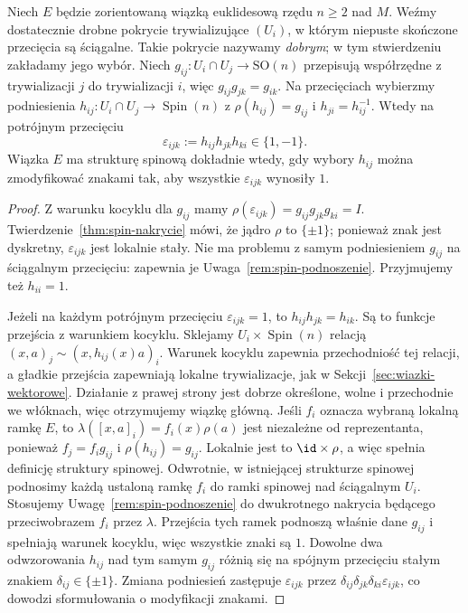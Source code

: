 \begin{stwierdzenie}
\label{prop:w2-znaki}
Niech $E$ będzie zorientowaną wiązką euklidesową
rzędu $n\geq2$ nad $M$. Weźmy dostatecznie drobne
pokrycie trywializujące $(U_i)$, w którym
niepuste skończone przecięcia są ściągalne. Takie pokrycie
nazywamy \emph{dobrym}; w tym stwierdzeniu zakładamy jego wybór.
Niech $g_{ij}:U_i\cap U_j\to\mathrm{SO}(n)$
przepisują współrzędne z trywializacji $j$ do trywializacji $i$,
więc $g_{ij}g_{jk}=g_{ik}$.
Na przecięciach wybierzmy podniesienia
$h_{ij}:U_i\cap U_j\to\operatorname{Spin}(n)$
z $\rho(h_{ij})=g_{ij}$ i $h_{ji}=h_{ij}^{-1}$.
Wtedy na potrójnym przecięciu
\begin{equation}\label{eq:w2-znaki}
 \varepsilon_{ijk}:=h_{ij}h_{jk}h_{ki}
          \in\{1,-1\}.
\end{equation}
Wiązka $E$ ma strukturę spinową dokładnie wtedy,
gdy wybory $h_{ij}$ można zmodyfikować znakami
tak, aby wszystkie $\varepsilon_{ijk}$ wynosiły $1$.
\end{stwierdzenie}
\begin{proof}
Z warunku kocyklu dla $g_{ij}$ mamy
$\rho(\varepsilon_{ijk})
=g_{ij}g_{jk}g_{ki}=I$.
Twierdzenie~\ref{thm:spin-nakrycie} mówi, że
jądro $\rho$ to $\{\pm1\}$; ponieważ znak jest
dyskretny, $\varepsilon_{ijk}$ jest lokalnie stały.
Nie ma problemu z samym podniesieniem
$g_{ij}$ na ściągalnym przecięciu:
zapewnia je Uwaga~\ref{rem:spin-podnoszenie}.
Przyjmujemy też $h_{ii}=1$.

Jeżeli na każdym potrójnym przecięciu
$\varepsilon_{ijk}=1$, to
$h_{ij}h_{jk}=h_{ik}$.
Są to funkcje przejścia z warunkiem kocyklu.
Sklejamy $U_i\times\operatorname{Spin}(n)$ relacją
$(x,a)_j\sim(x,h_{ij}(x)a)_i$. Warunek kocyklu zapewnia
przechodniość tej relacji, a gładkie przejścia zapewniają lokalne
trywializacje, jak w Sekcji~\ref{sec:wiazki-wektorowe}.
Działanie z prawej strony jest dobrze określone, wolne
i przechodnie we włóknach, więc otrzymujemy wiązkę główną.
Jeśli $f_i$ oznacza wybraną lokalną ramkę $E$, to
$\lambda([x,a]_i)=f_i(x)\rho(a)$ jest niezależne od reprezentanta,
ponieważ $f_j=f_i g_{ij}$ i $\rho(h_{ij})=g_{ij}$.
Lokalnie jest to $\id\times\rho$, a więc spełnia definicję
struktury spinowej.
Odwrotnie, w istniejącej strukturze spinowej podnosimy każdą
ustaloną ramkę $f_i$ do ramki spinowej nad ściągalnym $U_i$.
Stosujemy Uwagę~\ref{rem:spin-podnoszenie} do dwukrotnego
nakrycia będącego przeciwobrazem $f_i$ przez $\lambda$.
Przejścia tych ramek podnoszą właśnie dane $g_{ij}$ i spełniają
warunek kocyklu, więc wszystkie znaki są $1$.
Dowolne dwa odwzorowania $h_{ij}$ nad
tym samym $g_{ij}$ różnią się na spójnym
przecięciu stałym znakiem
$\delta_{ij}\in\{\pm1\}$.
Zmiana podniesień zastępuje
$\varepsilon_{ijk}$ przez
$\delta_{ij}\delta_{jk}\delta_{ki}
\varepsilon_{ijk}$, co dowodzi
sformułowania o modyfikacji znakami.
\end{proof}

